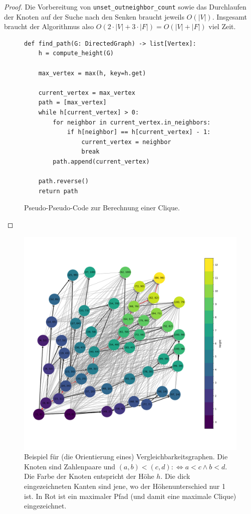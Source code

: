\documentclass[../main.tex]{subfiles}
\begin{document}
\begin{proof}
    Die Vorbereitung von \verb|unset_outneighbor_count| sowie das Durchlaufen der Knoten auf der Suche nach den Senken braucht jeweils $O(|V|)$. Insgesamt braucht der Algorithmus also $O(2\cdot|V| + 3\cdot|F|) = O(|V| + |F|)$ viel Zeit.

    \begin{figure}[ht]
        \label{algo:clique}
        \centering
        \begin{verbatim}
def find_path(G: DirectedGraph) -> list[Vertex]:
    h = compute_height(G)

    max_vertex = max(h, key=h.get)
    
    current_vertex = max_vertex
    path = [max_vertex]
    while h[current_vertex] > 0:
        for neighbor in current_vertex.in_neighbors:
            if h[neighbor] == h[current_vertex] - 1:
                current_vertex = neighbor
                break
        path.append(current_vertex)

    path.reverse()
    return path
        \end{verbatim}
        \caption{Pseudo-Pseudo-Code zur Berechnung einer Clique.}
    \end{figure}

\end{proof}
    
\begin{figure}[ht]
    \label{fig:comparability_graph}
    \centering
    \includegraphics[width=\textwidth]{figures/comparability_graph.png}
    \caption{Beispiel für (die Orientierung eines) Vergleichbarkeitsgraphen. Die Knoten sind Zahlenpaare und $(a, b) < (c, d) :\Leftrightarrow a < c \wedge b < d$. Die Farbe der Knoten entspricht der Höhe $h$. Die dick eingezeichneten Kanten sind jene, wo der Höhenunterschied nur 1 ist. In Rot ist ein maximaler Pfad (und damit eine maximale Clique) eingezeichnet.}
\end{figure}
    
\end{document}
